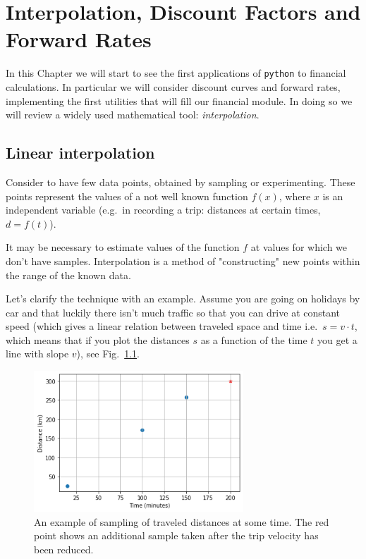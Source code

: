 \chapter{Interpolation, Discount Factors and Forward Rates}\label{interpolation---practical-lesson-3}

In this Chapter we will start to see the first applications of \texttt{python} to financial calculations.
In particular we will consider discount curves and forward rates, implementing the first utilities that will fill our financial module.
In doing so we will review a widely used mathematical tool: \emph{interpolation}.

\section{Linear interpolation}\label{linear-interpolation}

Consider to have few data points, obtained by sampling or experimenting. These points represent the values of a not well known function \(f(x)\), where \(x\) is an independent variable (e.g.~in recording a trip: distances at certain times, \(d = f(t)\)).

It may be necessary to estimate values of the function $f$ at values for which we don't have samples.
Interpolation is a method of "constructing" new points within the range of the known data.

Let's clarify the technique with an example.
Assume you are going on holidays by car and that luckily there isn't much traffic so that you can drive at constant speed (which gives a linear relation between traveled space and time i.e.~\(s = v \cdot t\), which means that if you plot the distances \(s\) as a function of the time \(t\) you get a line with slope \(v\)), see Fig.~\ref{fig:samples_for_interpolation}.

\begin{figure}
  \centering
  \includegraphics[width=0.7\textwidth]{figures/interp_example1.png}
  \caption{An example of sampling of traveled distances at some time. The red point shows an additional sample taken after the trip velocity has been reduced.}
  \label{fig:samples_for_interpolation}
\end{figure}

